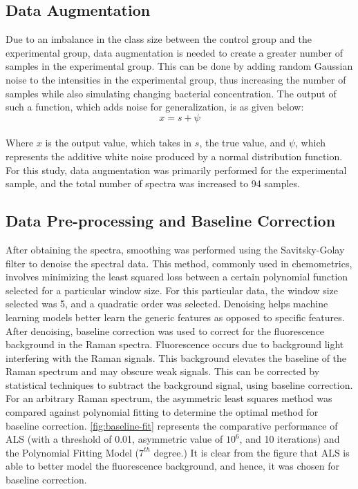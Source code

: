 \subsection{Data Augmentation}

Due to an imbalance in the class size between the control group and the experimental group, data augmentation is needed to create a greater number of samples in the experimental group. This can be done by adding random Gaussian noise to the intensities in the experimental group, thus increasing the number of samples while also simulating changing bacterial concentration. \cite{CEA_HAL_01839859} The output of such a function, which adds noise for generalization, is as given below: \\

$$
x = s + \psi
$$ \\

\noindent Where $x$ is the output value, which takes in $s$, the true value, and $\psi$, which represents the additive white noise produced by a normal distribution function. \cite{SciDirect_WhiteNoise} For this study, data augmentation was primarily performed for the experimental sample, and the total number of spectra was increased to 94 samples.

\subsection{Data Pre-processing and Baseline Correction}

After obtaining the spectra, smoothing was performed using the Savitsky-Golay filter to denoise the spectral data. This method, commonly used in chemometrics, involves minimizing the least squared loss between a certain polynomial function selected for a particular window size.  For this particular data, the window size selected was 5, and a quadratic order was selected. \cite{SciHub_AC60214a047} Denoising helps machine learning models better learn the generic features as opposed to specific features. \\

\noindent After denoising, baseline correction was used to correct for the fluorescence background in the Raman spectra. Fluorescence occurs due to background light interfering with the Raman signals. \cite{Cebeci2017_FluorescenceBackground} This background elevates the baseline of the Raman spectrum and may obscure weak signals. This can be corrected by statistical techniques to subtract the background signal, using baseline correction. For an arbitrary Raman spectrum, the asymmetric least squares method was compared against polynomial fitting to determine the optimal method for baseline correction. \autoref{fig:baseline-fit} represents the comparative performance of ALS (with a threshold of 0.01, asymmetric value of $10^6$, and 10 iterations) and the Polynomial Fitting Model ($7^{th}$ degree.)  It is clear from the figure that ALS is able to better model the fluorescence background, and hence, it was chosen for baseline correction. \\

